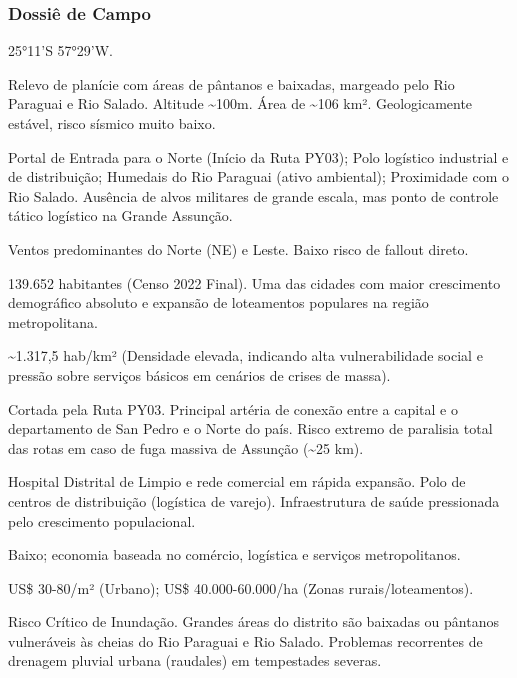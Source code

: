 \subsubsection{Dossiê de Campo}
\begin{description}[style=nextline,leftmargin=0.5cm,font=\bfseries]
\item[Coordenadas]  25°11'S 57°29'W.
\item[Topografia]  Relevo de planície com áreas de pântanos e baixadas, margeado pelo Rio Paraguai e Rio Salado. Altitude \textasciitilde 100m. Área de \textasciitilde 106 km². Geologicamente estável, risco sísmico muito baixo.
\item[Alvos Estratégicos]  Portal de Entrada para o Norte (Início da Ruta PY03); Polo logístico industrial e de distribuição; Humedais do Rio Paraguai (ativo ambiental); Proximidade com o Rio Salado. Ausência de alvos militares de grande escala, mas ponto de controle tático logístico na Grande Assunção.
\item[Fallout]  Ventos predominantes do Norte (NE) e Leste. Baixo risco de fallout direto.
\item[População]  139.652 habitantes (Censo 2022 Final). Uma das cidades com maior crescimento demográfico absoluto e expansão de loteamentos populares na região metropolitana.
\item[Densidade]  \textasciitilde 1.317,5 hab/\allowbreak km² (Densidade elevada, indicando alta vulnerabilidade social e pressão sobre serviços básicos em cenários de crises de massa).
\item[Vias de Acesso]  Cortada pela Ruta PY03. Principal artéria de conexão entre a capital e o departamento de San Pedro e o Norte do país. Risco extremo de paralisia total das rotas em caso de fuga massiva de Assunção (\textasciitilde 25 km).
\item[Serviços]  Hospital Distrital de Limpio e rede comercial em rápida expansão. Polo de centros de distribuição (logística de varejo). Infraestrutura de saúde pressionada pelo crescimento populacional.
\item[Custo de Vida]  Baixo; economia baseada no comércio, logística e serviços metropolitanos.
\item[Preço da Terra]  US\$ 30-80/\allowbreak m² (Urbano); US\$ 40.000-60.000/\allowbreak ha (Zonas rurais/\allowbreak loteamentos).
\item[Hidrologia]  Risco Crítico de Inundação. Grandes áreas do distrito são baixadas ou pântanos vulneráveis às cheias do Rio Paraguai e Rio Salado. Problemas recorrentes de drenagem pluvial urbana (raudales) em tempestades severas.

\end{description}
